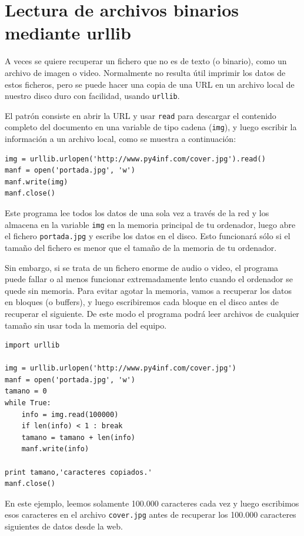 \section{Lectura de archivos binarios mediante urllib}

A veces se quiere recuperar un fichero que no es de texto (o binario), como
un archivo de imagen o video. Normalmente no resulta útil imprimir los datos de
estos ficheros, pero se puede hacer una copia de una URL en un archivo
local de nuestro disco duro con facilidad, usando {\tt urllib}.

El patrón consiste en abrir la URL y usar {\tt read} para descargar el contenido
completo del documento en una variable de tipo cadena ({\tt img}), y luego escribir la
información a un archivo local, como se muestra a continuación:

\beforeverb
\begin{verbatim}
img = urllib.urlopen('http://www.py4inf.com/cover.jpg').read()
manf = open('portada.jpg', 'w')
manf.write(img)
manf.close()
\end{verbatim}
\afterverb
%
Este programa lee todos los datos de una sola vez a través de la red y los
almacena en la variable {\tt img} en la memoria principal de tu ordenador,
luego abre el fichero {\tt portada.jpg} y escribe los datos en el
disco. Esto funcionará sólo si el tamaño del fichero es menor que el tamaño
de la memoria de tu ordenador.

Sin embargo, si se trata de un fichero enorme de audio o video, el programa puede fallar
o al menos funcionar extremadamente lento cuando el ordenador se quede sin memoria.
Para evitar agotar la memoria, vamos a recuperar los datos en bloques
(o buffers), y luego escribiremos cada bloque en el disco antes de recuperar
el siguiente. De este modo el programa podrá leer archivos de cualquier tamaño sin
usar toda la memoria del equipo.

\beforeverb
\begin{verbatim}
import urllib

img = urllib.urlopen('http://www.py4inf.com/cover.jpg')
manf = open('portada.jpg', 'w')
tamano = 0
while True:
    info = img.read(100000)
    if len(info) < 1 : break
    tamano = tamano + len(info)
    manf.write(info)

print tamano,'caracteres copiados.'
manf.close()
\end{verbatim}
\afterverb
%
En este ejemplo, leemos solamente 100.000 caracteres cada vez y luego
escribimos esos caracteres en el archivo {\tt cover.jpg}
antes de recuperar los 100.000 caracteres siguientes de datos desde
la web.


